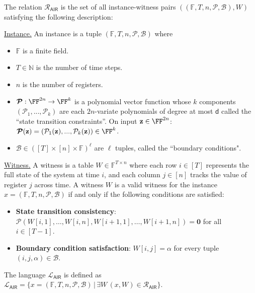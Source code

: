 
\begin{definition}
The relation $\mathcal{R}_\mathsf{AIR}$ is the set of all instance-witness pairs $((\mathbb{F}, T, n, \boldsymbol{\mathcal{P}}, \boldsymbol{\mathcal{B}}), W)$ satisfying the following description:

\noindent\underline{Instance.} An instance is a tuple $(\mathbb{F}, T, n, \boldsymbol{\mathcal{P}}, \boldsymbol{\mathcal{B}})$ where
\begin{itemize}\itemsep0pt
    \item $\mathbb{F}$ is a finite field.
    \item $T \in \mathbb{N}$ is the number of time steps.
    \item $n$ is the number of registers.
    \item $\boldsymbol{\mathcal{P}}: \FF^{2n} \rightarrow \FF^k$ %
    is a polynomial vector function whose $k$ components $(\mathcal{P}_1,...,\mathcal{P}_k)$ are each $2n$-variate polynomials of degree at most $\mathsf{d}$ called the ``state transition constraints''. On input $\mathbf{z} \in \FF^{2n}$: $\boldsymbol{\mathcal{P}}(\mathbf{z}) = (\mathcal{P}_1(\mathbf{z}),...,\mathcal{P}_k(\mathbf{z})) \in \FF^k$. 
    \item $\boldsymbol{\mathcal{B}} \in ([T] \times [n] \times \mathbb{F})^\ell$ are $\ell$ tuples, called the ``boundary conditions".
\end{itemize}

\noindent\underline{Witness.} A witness is a table $W \in \mathbb{F}^{T \times n}$ where each row $i \in [T]$ represents the full state of the system at time $i$, and each column $j \in [n]$ tracks the value of register $j$ across time. A witness $W$ is a valid witness for the instance $x = (\mathbb{F}, T, n, \boldsymbol{\mathcal{P}}, \boldsymbol{\mathcal{B}})$ if and only if the following conditions are satisfied:
\begin{itemize}\itemsep0pt
    \item \textbf{State transition consistency}: $\boldsymbol{\mathcal{P}}(W[i,1], \ldots, W[i,n], W[i+1, 1], \ldots, W[i+1,n]) = \boldsymbol{0}$ for all $i \in [T-1]$.
    \item \textbf{Boundary condition satisfaction}: $W[i,j] = \alpha$ for every tuple $(i, j, \alpha) \in \boldsymbol{\mathcal{B}}$.
\end{itemize}

The language $\mathcal{L}_\mathsf{AIR}$ is defined as $\mathcal{L}_\mathsf{AIR} = \{x=(\mathbb{F}, T, n, \boldsymbol{\mathcal{P}}, \boldsymbol{\mathcal{B}}) \, | \, \exists W \, (x,W) \in \mathcal{R}_\mathsf{AIR}\}$.
\end{definition}


